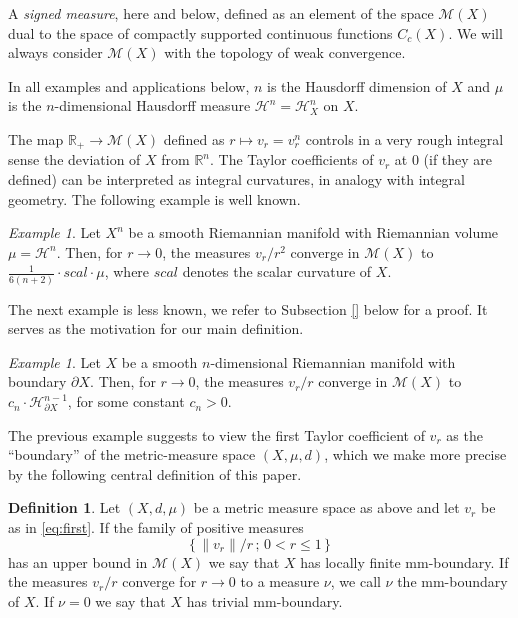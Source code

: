\documentclass[12pt,leqno]{amsart}
\numberwithin{equation}{section}
\theoremstyle{definition}
\newtheorem{defn}[thm]{Definition}%
\theoremstyle{remark}
\newtheorem{ex}[thm]{Example}
\newcommand{\R}{\mathbb{R}}
\begin{document}
A \emph{signed measure}, here and below, defined as an element of the space $\mathcal M(X)$ dual to the space of compactly supported continuous functions $C_c (X)$.
We will always consider $\mathcal M(X)$ with the topology of weak convergence.

In all examples and applications below,  $n$  is the Hausdorff dimension of $X$ and $\mu$ is the $n$-dimensional Hausdorff measure $\mathcal H^n =\mathcal H^n _X$ on $X$.


The map $\mathbb{R}_+\to\mathcal M(X)$ defined as $r\mapsto  v_r=v_r ^n$ controls in a very rough integral sense the deviation of $X$ from $\R^n$.
The Taylor coefficients of $v_r$ at $0$ (if they are defined) can be interpreted as integral curvatures, in analogy with integral geometry. The following  example is well known.



    \begin{ex} \label{smoothscal}
 Let $X^n$ be a  smooth Riemannian manifold with  Riemannian volume $\mu =\mathcal H^n$.  Then, for $r\to 0$,
  the measures $v_r /r^2$ converge in $\mathcal M(X)$ to $\frac 1 {6(n+2)}\cdot scal \cdot \mu$, where
  $scal$ denotes the scalar curvature of $X$.
\end{ex}



The next example is less known, we refer to Subsection \ref{} below for a proof.  It serves as the  motivation for our main definition.



  \begin{ex} \label{mainex}
Let $X$ be a smooth $n$-dimensional Riemannian manifold with boundary $\partial X$.
Then, for $r\to 0$, the measures   $v_r/r$  converge in $\mathcal M(X)$ to
$c_n \cdot \mathcal H^{n-1} _{\partial X}$, for some constant $c_n >0$.
\end{ex}

The previous example  suggests  to view the first Taylor coefficient of $v_r$   as the ``boundary'' of the metric-measure space $(X,\mu,d)$,
 which we make more precise by the following central definition of this paper.

\begin{defn}
Let $(X,d,\mu)$ be a metric measure space as above and let  $v_r$ be as in \eqref{eq:first}. If the  family of positive measures 
\[\{\,\| v_r \|  /r \,;\,  0<r\leq  1 \,\}\]   
has an upper bound in $\mathcal M( X)$ we say that $X$ has   locally finite mm-boundary.
If the measures $v_r /r$  converge for $r\to 0$ to a measure $\nu$, we call $\nu$ the mm-boundary of $X$.  If $\nu =0$ we say that $X$ has trivial mm-boundary.
\end{defn}
\end{document}

